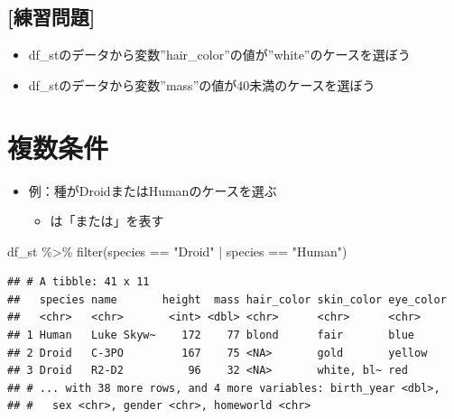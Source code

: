 \documentclass[
  xelatex,ja=standard, b5paper]{bxjsbook}
\newenvironment{Shaded}{\begin{snugshade}}{\end{snugshade}}
\newcommand{\FunctionTok}[1]{\textcolor[rgb]{0.00,0.00,0.00}{#1}}
\newcommand{\NormalTok}[1]{#1}
\newcommand{\SpecialCharTok}[1]{\textcolor[rgb]{0.00,0.00,0.00}{#1}}
\newcommand{\StringTok}[1]{\textcolor[rgb]{0.31,0.60,0.02}{#1}}
\providecommand{\tightlist}{%
  \setlength{\itemsep}{0pt}\setlength{\parskip}{0pt}}
\begin{document}
\hypertarget{ux7df4ux7fd2ux554fux984c-6}{%
\subsection{{[}練習問題{]}}\label{ux7df4ux7fd2ux554fux984c-6}}

\begin{itemize}
\tightlist
\item
  df\_stのデータから変数''hair\_color''の値が''white''のケースを選ぼう
\item
  df\_stのデータから変数''mass''の値が40未満のケースを選ぼう
\end{itemize}

\hypertarget{filter-multi}{%
\section{複数条件}\label{filter-multi}}

\begin{itemize}
\tightlist
\item
  例：種がDroidまたはHumanのケースを選ぶ

  \begin{itemize}
  \tightlist
  \item
    \texttt{\textbar{}}は「または」を表す
  \end{itemize}
\end{itemize}

\begin{Shaded}
\begin{Highlighting}[]
\NormalTok{df\_st }\SpecialCharTok{\%\textgreater{}\%} 
  \FunctionTok{filter}\NormalTok{(species }\SpecialCharTok{==} \StringTok{"Droid"} \SpecialCharTok{|}\NormalTok{ species }\SpecialCharTok{==} \StringTok{"Human"}\NormalTok{)}
\end{Highlighting}
\end{Shaded}

\begin{verbatim}
## # A tibble: 41 x 11
##   species name       height  mass hair_color skin_color eye_color
##   <chr>   <chr>       <int> <dbl> <chr>      <chr>      <chr>    
## 1 Human   Luke Skyw~    172    77 blond      fair       blue     
## 2 Droid   C-3PO         167    75 <NA>       gold       yellow   
## 3 Droid   R2-D2          96    32 <NA>       white, bl~ red      
## # ... with 38 more rows, and 4 more variables: birth_year <dbl>,
## #   sex <chr>, gender <chr>, homeworld <chr>
\end{verbatim}
\end{document}
